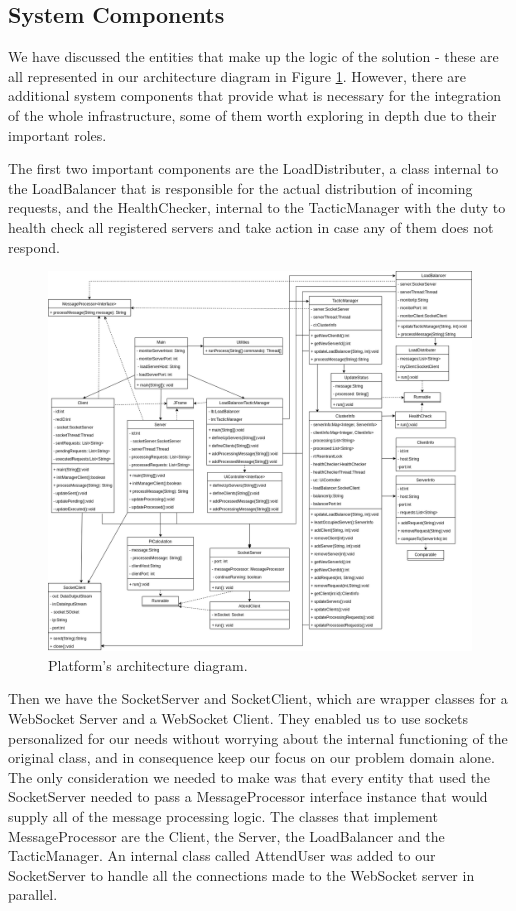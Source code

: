 \documentclass[12pt]{article}
\begin{document}
\subsection{System Components} %

We have discussed the entities that make up the logic of the solution - these are all represented in our architecture diagram in Figure \ref{pa3Arch}.
However, there are additional system components that provide what is necessary for the integration of the whole infrastructure, some of them worth exploring in 
depth due to their important roles.

The first two important components are the LoadDistributer, a class internal to the LoadBalancer that is responsible for the actual distribution of incoming requests, 
and the HealthChecker, internal to the TacticManager with the duty to health check all registered servers and take action in case any of them does not respond.

\begin{figure}[H]
  \centering
  \begin{minipage}{\textwidth}
    \centering
    \includegraphics[width=\linewidth]{img/pa3Arch.png}
  \end{minipage}%
  \caption{Platform's architecture diagram.}
  \label{pa3Arch}
\end{figure} 

Then we have the SocketServer and SocketClient, which are wrapper classes for a WebSocket Server and a WebSocket Client.
They enabled us to use sockets personalized for our needs without worrying about the internal functioning of the original class, and in consequence keep our 
focus on our problem domain alone.
The only consideration we needed to make was that every entity that used the SocketServer needed to pass a MessageProcessor interface instance that would supply
all of the message processing logic.
The classes that implement MessageProcessor are the Client, the Server, the LoadBalancer and the TacticManager.
An internal class called AttendUser was added to our SocketServer to handle all the connections made to the WebSocket server in parallel.
\end{document}
